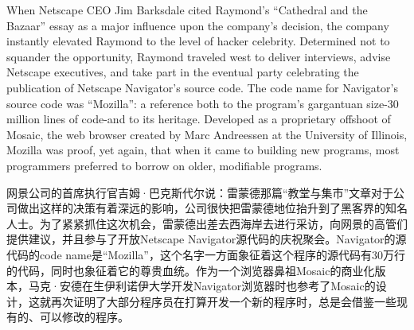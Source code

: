 \ifdefined\eng
When Netscape CEO Jim Barksdale cited Raymond's ``Cathedral and the Bazaar'' essay as a major influence upon the company's decision, the company instantly elevated Raymond to the level of hacker celebrity. Determined not to squander the opportunity, Raymond traveled west to deliver interviews, advise Netscape executives, and take part in the eventual party celebrating the publication of Netscape Navigator's source code. The code name for Navigator's source code was ``Mozilla'': a reference both to the program's gargantuan size-30 million lines of code-and to its heritage. Developed as a proprietary offshoot of Mosaic, the web browser created by Marc Andreessen at the University of Illinois, Mozilla was proof, yet again, that when it came to building new programs, most programmers preferred to borrow on older, modifiable programs.
\fi

\ifdefined\chs
网景公司的首席执行官吉姆·巴克斯代尔说：雷蒙德那篇``教堂与集市''文章对于公司做出这样的决策有着深远的影响，公司很快把雷蒙德地位抬升到了黑客界的知名人士。为了紧紧抓住这次机会，雷蒙德出差去西海岸去进行采访，向网景的高管们提供建议，并且参与了开放Netscape Navigator源代码的庆祝聚会。Navigator的源代码的code name是``Mozilla''，这个名字一方面象征着这个程序的源代码有30万行的代码，同时也象征着它的尊贵血统。作为一个浏览器鼻祖Mosaic的商业化版本，马克·安德在生伊利诺伊大学开发Navigator浏览器时也参考了Mosaic的设计，这就再次证明了大部分程序员在打算开发一个新的程序时，总是会借鉴一些现有的、可以修改的程序。
\fi



